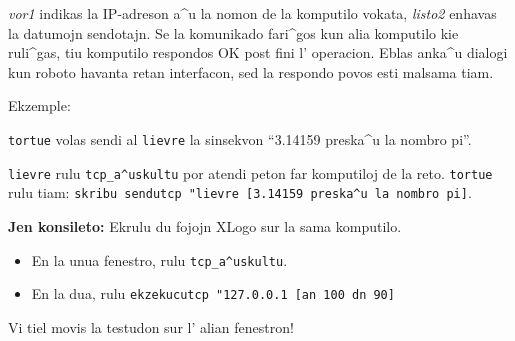\textit{vor1} indikas la IP-adreson a^u la nomon de la komputilo
vokata, \textit{listo2} enhavas la datumojn sendotajn.  Se la
komunikado fari^gos kun alia komputilo kie \xlogo{} ruli^gas, tiu
komputilo respondos OK post fini l' operacion.  Eblas anka^u dialogi
kun roboto havanta retan interfacon, sed la respondo povos esti
malsama tiam.

Ekzemple: 

\texttt{tortue} volas sendi al \texttt{lievre} la sinsekvon ``3.14159
preska^u la nombro pi''.

\texttt{lievre} rulu \texttt{tcp\_a^uskultu} por atendi peton far
komputiloj de la reto.  \texttt{tortue} rulu tiam:
\texttt{skribu~sendutcp~"lievre~[3.14159 preska^u la nombro pi]}.

\textbf{Jen konsileto:} Ekrulu du fojojn XLogo sur la sama komputilo.
\begin{itemize}
 \item En la unua fenestro, rulu \texttt{tcp\_a^uskultu}.
 \item En la dua, rulu \texttt{ekzekucutcp "127.0.0.1 [an 100 dn 90]}
\end{itemize}

Vi tiel movis la testudon sur l' alian fenestron!
